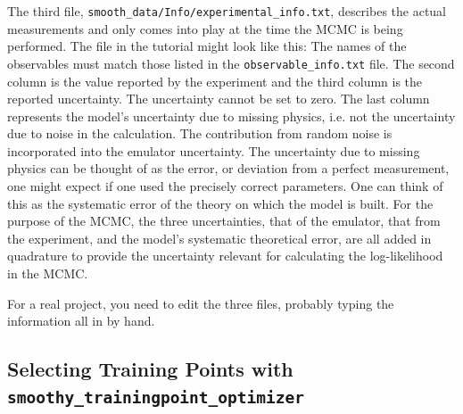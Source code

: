 \documentclass[UserManual.tex]{subfiles}
\begin{document}
\begin{sloppypar}
The third file, {\tt smooth\_data/Info/experimental\_info.txt}, describes the actual measurements and only comes into play at the time the MCMC is being performed. The file in the tutorial might look like this:
\vspace*{-8pt}{\tt \begin{Verbatim}[commandchars=\\\{\}]
obs0  57.840878  10.0 0.0
obs1  -85.613188  10.0 0.0
obs2  43.335184  10.0 0.0
obs3  40.159450  10.0 0.0
obs4  38.013337  10.0 0.0
obs5  64.492673  10.0 0.0
obs6  -195.300157  10.0 0.0
obs7  99.587427  10.0 0.0
obs8  7.963056  10.0 0.0
obs9  68.844147  10.0 0.0
\end{Verbatim}
}\vspace*{-8pt}
The names of the observables must match those listed in the {\tt observable\_info.txt} file. The second column is the value reported by the experiment and the third column is the reported uncertainty. The uncertainty cannot be set to zero. The last column represents the model's uncertainty due to missing physics, i.e. not the uncertainty due to noise in the calculation. The contribution from random noise is incorporated into the emulator uncertainty. The uncertainty due to missing physics can be thought of as the error, or deviation from a perfect measurement, one might expect if one used the precisely correct parameters. One can think of this as the systematic error of the theory on which the model is built. For the purpose of the MCMC, the three uncertainties, that of the emulator, that from the experiment, and the model's systematic theoretical error, are all added in quadrature to provide the uncertainty relevant for calculating the log-likelihood in the MCMC.

For a real project, you need to edit the three files, probably typing the information all in by hand. 

\subsection{Selecting Training Points with {\tt smoothy\_trainingpoint\_optimizer}}


\end{sloppypar}
\end{document}

